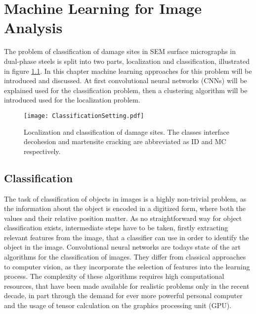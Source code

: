 
\chapter{Machine Learning for Image Analysis} %

\label{CNN} %

The problem of classification of damage sites in SEM surface micrographs in dual-phase steels is split into two parts, localization and classification, illustrated in figure \ref{fig:DPSteelProblem}. In this chapter machine learning approaches for this problem will be introduced and discussed. At first convolutional neural networks (CNNs) will be explained used for the classification problem, then a clustering algorithm will be introduced used for the localization problem. \\

\begin{figure}
\centering
\texttt{[image: ClassificationSetting.pdf]}
\caption{Localization and classification of damage sites. The classes interface decohesion and martensite cracking are abbreviated as ID and MC respectively.}
\label{fig:DPSteelProblem}
\end{figure}

\section{Classification}

The task of classification of objects in images is a highly non-trivial problem, as the information about the object is encoded in a digitized form, where both the values and their relative position matter. As no straightforward way for object classification exists, intermediate steps have to be taken, firstly extracting relevant features from the image, that a classifier can use in order to identify the object in the image. Convolutional neural networks are todays state of the art algorithms for the classification of images. They differ from classical approaches to computer vision, as they incorporate the selection of features into the learning process. The complexity of these algorithms requires high computational resources, that have been made available for realistic problems only in the recent decade, in part through the demand for ever more powerful personal computer and the usage of tensor calculation on the graphics processing unit (GPU). \\

